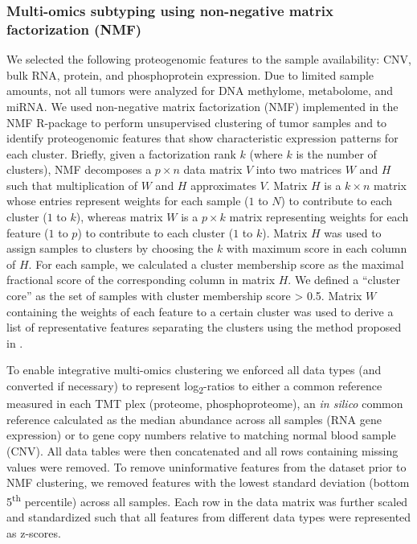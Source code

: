 \subsubsection{Multi-omics subtyping using non-negative matrix factorization (NMF)}
We selected the following proteogenomic features to the sample availability: CNV, bulk RNA, protein, and phosphoprotein expression. Due to limited sample amounts, not all tumors were analyzed for DNA methylome, metabolome, and miRNA. We used non-negative matrix factorization (NMF) implemented in the NMF R-package \cite{gaujouxr_seoighec:FlexiblePackage2010} to perform unsupervised clustering of tumor samples and to identify proteogenomic features that show characteristic expression patterns for each cluster. Briefly, given a factorization rank $k$ (where $k$ is the number of clusters), NMF decomposes a $p \times n$ data matrix $V$ into two matrices $W$ and $H$ such that multiplication of $W$ and $H$ approximates $V$. Matrix $H$ is a $k \times n$ matrix whose entries represent weights for each sample ($1$ to $N$) to contribute to each cluster ($1$ to $k$), whereas matrix $W$ is a $p × k$ matrix representing weights for each feature ($1$ to $p$) to contribute to each cluster ($1$ to $k$). Matrix $H$ was used to assign samples to clusters by choosing the $k$ with maximum score in each column of $H$. For each sample, we calculated a cluster membership score as the maximal fractional score of the corresponding column in matrix $H$. We defined a ``cluster core'' as the set of samples with cluster membership score > 0.5. Matrix $W$ containing the weights of each feature to a certain cluster was used to derive a list of representative features separating the clusters using the method proposed in \cite{kimh_parkh:SparseNonnegative2007}.

To enable integrative multi-omics clustering we enforced all data types (and converted if necessary) to represent log\textsubscript{2}-ratios to either a common reference measured in each TMT plex (proteome, phosphoproteome), an \textit{in silico} common reference calculated as the median abundance across all samples (RNA gene expression) or to gene copy numbers relative to matching normal blood sample (CNV). All data tables were then concatenated and all rows containing missing values were removed. To remove uninformative features from the dataset prior to NMF clustering, we removed features with the lowest standard deviation (bottom 5\textsuperscript{th} percentile) across all samples. Each row in the data matrix was further scaled and standardized such that all features from different data types were represented as z-scores.

